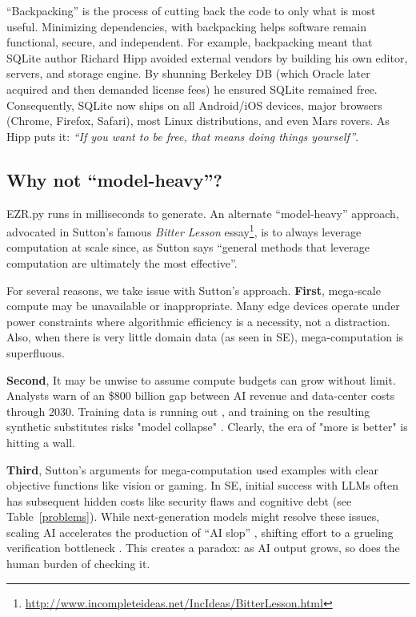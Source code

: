 ``Backpacking'' is the process of cutting back the code to only what is most useful\cite{hipp2021}.
Minimizing dependencies, with backpacking  helps software remain functional, secure, and independent. For example,
backpacking meant that SQLite author Richard Hipp avoided external vendors by building his own editor, servers, and storage engine. By shunning Berkeley DB
(which Oracle later acquired and then demanded license fees)
he ensured SQLite remained free. Consequently, SQLite now ships on all Android/iOS devices, major browsers (Chrome, Firefox, Safari), most Linux distributions, and even Mars rovers.  As Hipp puts it:
{\em ``If you want to be free, that means doing things yourself''}\cite{hipp2021}.


\subsection{Why not ``model-heavy''?}
EZR.py runs in milliseconds to generate. An alternate ``model-heavy'' approach, advocated in Sutton’s famous {\em Bitter Lesson} essay\footnote{\url{http://www.incompleteideas.net/IncIdeas/BitterLesson.html}}, is to always
 leverage computation at scale since, as Sutton  says  ``general methods that leverage computation are
ultimately the most effective''.

For several reasons, we take issue with  Sutton's   approach.
{\bf First}, mega-scale compute may be
unavailable or inappropriate. Many edge devices operate under power constraints where algorithmic efficiency is a necessity, not a distraction. Also, when there is very little domain data (as seen in SE), mega-computation is superfluous.


{\bf Second}, It may be unwise to assume  compute budgets can grow without limit. Analysts warn of an \$800 billion gap between AI revenue and data-center costs through 2030. Training data is running out \cite{villalobosposition}, and training on the resulting synthetic substitutes risks "model collapse" \cite{shumailov2024}. Clearly, the era of  "more is better"   is hitting a wall.

 


{\bf Third}, Sutton’s arguments for mega-computation used
examples with clear objective functions like vision or gaming. In SE,
initial success  with LLMs often has subsequent hidden costs like security flaws
\cite{S15} and cognitive debt \cite{CognitiveDebt} (see
Table~\ref{problems}). While next-generation models might resolve these
issues, scaling AI accelerates the production of ``AI slop''
\cite{baltes2026anendlessstreamai}, shifting effort to a grueling
verification bottleneck \cite{S10}. This creates a paradox: as AI
output grows, so does the human burden of checking it.


